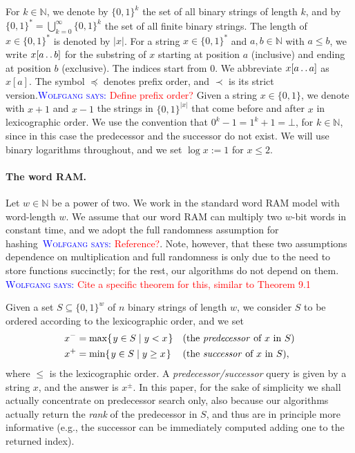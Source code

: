 \documentclass[a4paper,11pt]{article}
\newcommand{\N}{\mathbb{N}}
\newcommand{\?}{\mskip1.5mu}
\def\..{\,\mathpunct{\ldotp\ldotp}} %
\newcommand{\aremark}[3]{\textcolor{blue}{\textsc{#1 #2:}}
  \textcolor{red}{\textsf{#3}}}
\newcommand{\wolfgang}[2][says]{\aremark{Wolfgang}{#1}{#2}}
\begin{document}
For $k \in \N$, we denote by $\{0, 1\}^k$ the set of all binary 
strings of length $k$, and by 
$\{0,1\}^* = \bigcup_{k = 0}^{\infty} \{0, 1\}^k$ the set of all
finite binary strings. The length of $x \in \{0, 1\}^*$ 
is denoted by $|x|$.
For a string $x \in \{0, 1\}^*$ and $a, b \in \N$ with $a \leq b$, 
we write $x[a \.. b]$ for the substring of $x$ starting at position
$a$ (inclusive) and ending at position $b$ (exclusive). 
The indices start from $0$. We abbreviate $x[a \.. a]$ as $x[a]$.
The symbol $\preceq$ denotes prefix order, and $\prec$ is its 
strict version.\wolfgang{Define prefix order?} Given a string 
$x \in \{0,1\}$, we denote with $x + 1$ and $x - 1$ the strings in 
$\{0, 1\}^{|x|}$ that come before and after $x$ in lexicographic 
order. We use the convention that $0^k - 1 = 1^k + 1 = \bot$, for 
$k \in \N$, since in this case the predecessor and the successor do 
not exist. We will use binary logarithms throughout, and we set 
$\log x :=1$ for $x \leq 2$.

\paragraph{The word RAM.}
Let $w \in \N$ be a power of two. We work in the standard word RAM 
model with word-length $w$. We assume that our word RAM can multiply
two $w$-bit words in constant time, and we adopt the full 
randomness assumption for hashing~\wolfgang{Reference?}. Note, 
however, that these two assumptions  dependence on multiplication and full randomness is only due to the
need to store functions succinctly; for the rest, our algorithms do not depend
on them.
\wolfgang{Cite a specific theorem for this, similar to Theorem 9.1}

Given a set $S \subseteq \{0, 1\}^w$ of $n$ binary strings of 
length $w$, we consider $S$ to be ordered according to the 
lexicographic order, and we set
\begin{align*}
     x^- &= \max\{\?y \in S \mid y< x\?\} &&\text{(the \emph{predecessor} of
     $x$ in $S$)}\\
    x^+ &= \min\{\?y \in S \mid y\geq x\?\} && \text{(the \emph{successor} of
    $x$ in $S$)},
\end{align*}
where $\leq$ is the lexicographic order. A \emph{predecessor/successor} query is
given by a string $x$, and the answer is $x^\pm$. In this paper, for the sake
of simplicity we shall actually concentrate on predecessor search only,
also because our algorithms actually return the \emph{rank} of the predecessor
in $S$, and thus are in principle more informative (e.g., the successor can be
immediately computed adding one to the returned index).
\end{document}
